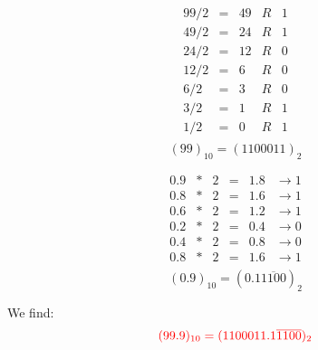 \documentclass[pdftex,11pt]{article}
\begin{document}
\begin{enumerate}
\begin{minipage}{.4\textwidth}
$$
\begin{array}{rcrcc}
99/2  & = &    49 & R & 1 \\
49/2  & = &    24 & R & 1 \\
24/2  & = &    12 & R & 0 \\
12/2  & = &     6 & R & 0 \\
6/2   & = &     3 & R & 0 \\
3/2   & = &     1 & R & 1 \\
1/2   & = &     0 & R & 1 \\
\end{array}
$$
$$(99)_{10} = (1100011)_2$$
\end{minipage}
\begin{minipage}{.4\textwidth}
$$
\begin{array}{rcrccc}
0.9& *& 2   & = & 1.8 &    \rightarrow     1  \\
0.8& *& 2   & = & 1.6 &    \rightarrow     1  \\
0.6& *& 2   & = & 1.2 &    \rightarrow     1  \\
0.2& *& 2   & = & 0.4 &    \rightarrow     0  \\
0.4& *& 2   & = & 0.8 &    \rightarrow     0  \\
\hline
0.8& *& 2   & = & 1.6 &    \rightarrow     1  \\
\end{array}
$$
$$ (0.9)_{10} = (0.1\overline{1100})_2$$
\end{minipage}

We find:
$$\color{red} (99.9)_{10} = (1100011.1\overline{1100})_2 $$


\end{enumerate}
\end{document}
